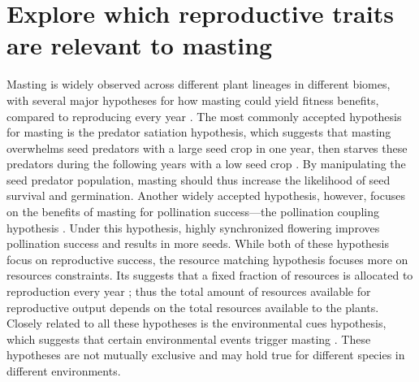 \documentclass[11pt,letter]{article}
\begin{document}
\section{Explore which reproductive traits are relevant to masting}
Masting is widely observed across different plant lineages in different biomes, with several major hypotheses for how masting could yield fitness benefits, compared to reproducing every year \citep{koenig2021brief, waller1979models}. The most commonly accepted hypothesis for masting is the predator satiation hypothesis, which suggests that masting overwhelms seed predators with a large seed crop in one year, then starves these predators during the following years with a low seed crop \citep{janzen1971seed}. By manipulating the seed predator population, masting should thus increase the likelihood of seed survival and germination. Another widely accepted hypothesis, however, focuses on the benefits of masting for pollination success---the pollination coupling hypothesis \citep{crone2014resource}. Under this hypothesis, highly synchronized flowering improves pollination success and results in more seeds. While both of these hypothesis focus on reproductive success, the resource matching hypothesis focuses more on resources constraints. 
Its suggests that a fixed fraction of resources is allocated to reproduction every year \citep{kelly1994evolutionary}; thus the total amount of resources available for reproductive output depends on the total resources available to the plants. 
Closely related to all these hypotheses is the environmental cues hypothesis, which suggests that certain environmental events trigger masting \citep{pearse2016mechanisms}. These hypotheses are not mutually exclusive and may hold true for different species in different environments.\par
\end{document}
